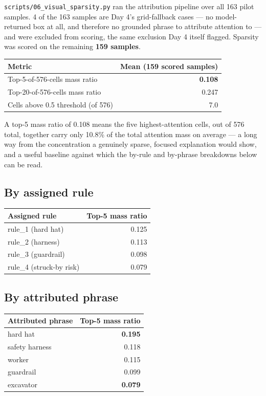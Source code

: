 \texttt{scripts/06\_visual\_sparsity.py} ran the attribution pipeline over all 163 pilot samples.
4 of the 163 samples are Day 4's grid-fallback cases --- no model-returned box at all, and
therefore no grounded phrase to attribute attention to --- and were excluded from scoring, the
same exclusion Day 4 itself flagged. Sparsity was scored on the remaining \textbf{159 samples}.

\begin{center}
\begin{tabular}{lr}
\toprule
\textbf{Metric} & \textbf{Mean (159 scored samples)} \\
\midrule
Top-5-of-576-cells mass ratio & \textbf{0.108} \\
Top-20-of-576-cells mass ratio & 0.247 \\
Cells above 0.5 threshold (of 576) & 7.0 \\
\bottomrule
\end{tabular}
\end{center}

A top-5 mass ratio of 0.108 means the five highest-attention cells, out of 576 total, together
carry only 10.8\% of the total attention mass on average --- a long way from the concentration a
genuinely sparse, focused explanation would show, and a useful baseline against which the
by-rule and by-phrase breakdowns below can be read.

\subsection{By assigned rule}

\begin{center}
\begin{tabular}{lr}
\toprule
\textbf{Assigned rule} & \textbf{Top-5 mass ratio} \\
\midrule
rule\_1 (hard hat) & 0.125 \\
rule\_2 (harness) & 0.113 \\
rule\_3 (guardrail) & 0.098 \\
rule\_4 (struck-by risk) & 0.079 \\
\bottomrule
\end{tabular}
\end{center}

\subsection{By attributed phrase}

\begin{center}
\begin{tabular}{lr}
\toprule
\textbf{Attributed phrase} & \textbf{Top-5 mass ratio} \\
\midrule
hard hat & \textbf{0.195} \\
safety harness & 0.118 \\
worker & 0.115 \\
guardrail & 0.099 \\
excavator & \textbf{0.079} \\
\bottomrule
\end{tabular}
\end{center}

